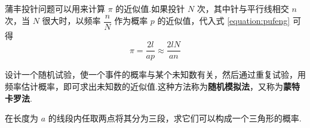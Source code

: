 \begin{solution}
\begin{figure}[H]
\begin{minipage}[b]{0.48\linewidth}
            \caption{}
            \label{fig:pufeng:1}
        \end{minipage}
        \hfill
        \begin{minipage}[b]{0.48\linewidth}
            \centering
    
            
            \caption{}
            \label{fig:pufeng:2}
        \end{minipage}
    \end{figure}
\end{solution}

\begin{note}
    \indent 蒲丰投针问题可以用来计算 $\pi$ 的近似值.如果投针 $N$ 次，其中针与平行线相交 $n$ 次，当 $N$ 很大时，以频率 $\dfrac{n}{N}$ 作为概率 $p$ 的近似值，代入式 \eqref{equation:pufeng} 可得
    $$
    \pi = \dfrac{2l}{ap} \approx \dfrac{2lN}{an}
    $$

    设计一个随机试验，使一个事件的概率与某个未知数有关，然后通过重复试验，用频率估计概率，即可求出未知数的近似值.这种方法称为\textbf{随机模拟法}，又称为\textbf{蒙特卡罗法}.
\end{note}

\begin{example}
    \indent 在长度为 $a$ 的线段内任取两点将其分为三段，求它们可以构成一个三角形的概率.
\end{example}

